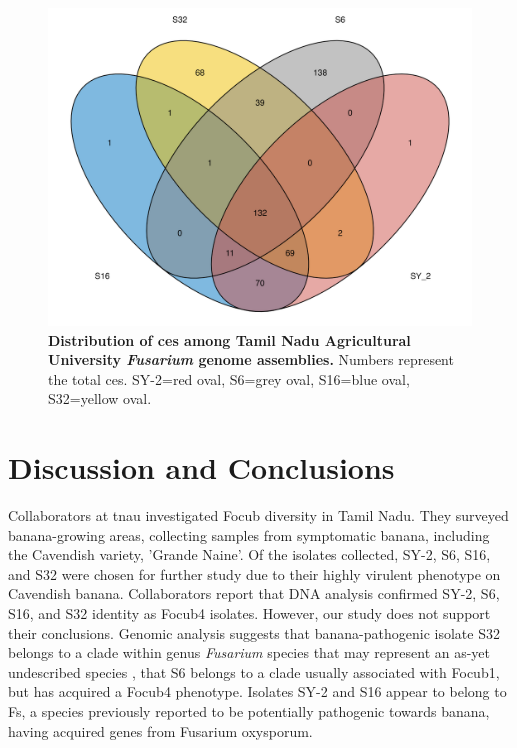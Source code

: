 \begin{figure}[h!]
  \centering
  \includegraphics[width=12cm]{Figures/sharedCandEffsVenn.png}
  \caption[Distribution of \acp{ce} among Tamil Nadu Agricultural University \textit{Fusarium} genome assemblies.]{\textbf{Distribution of \acp{ce} among Tamil Nadu Agricultural University \textit{Fusarium} genome assemblies.} Numbers represent the total \acp{ce}. SY-2=red oval, S6=grey oval, S16=blue oval, S32=yellow oval.}
  \label{fig:TNAUVenn}
\end{figure}


\newpage
\section{Discussion and Conclusions}

Collaborators at \ac{tnau}  investigated \ac{Focub} diversity in Tamil Nadu. They surveyed banana-growing areas, collecting samples from symptomatic banana, including the Cavendish variety, 'Grande Naine'. Of the isolates collected, SY-2, S6, S16, and S32 were chosen for further study due to their highly virulent phenotype on Cavendish banana. Collaborators report that DNA analysis confirmed SY-2, S6, S16, and S32 identity as \ac{Focub4} isolates. However, our study does not support their conclusions. Genomic analysis suggests that banana-pathogenic isolate S32 belongs to a clade within genus \textit{Fusarium} species that may represent an as-yet undescribed species , that S6 belongs to a clade usually associated with \ac{Focub1}, but   has acquired a \ac{Focub4} phenotype. Isolates SY-2 and S16 appear to belong to \ac{Fs}, a species  previously reported to be potentially pathogenic towards banana, having acquired genes from Fusarium oxysporum.

